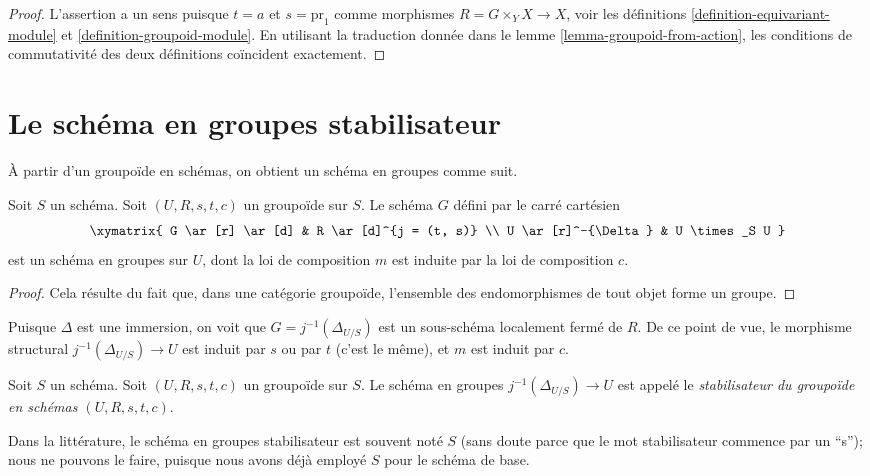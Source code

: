 \begin{proof}
L'assertion a un sens puisque $t = a$ et $s = \text{pr}_1$
comme morphismes $R = G \times_Y X \to X$, voir les
définitions \ref{definition-equivariant-module} et
\ref{definition-groupoid-module}.
En utilisant la traduction donnée dans le lemme \ref{lemma-groupoid-from-action},
les conditions de commutativité
des deux définitions coïncident exactement.
\end{proof}





\section{Le schéma en groupes stabilisateur}
\label{section-stabilizer}

\noindent
À partir d'un groupoïde en schémas, on obtient un schéma en groupes comme suit.

\begin{lemma}
\label{lemma-groupoid-stabilizer}
Soit $S$ un schéma.
Soit $(U, R, s, t, c)$ un groupoïde sur $S$.
Le schéma $G$ défini par le carré cartésien
$$
\xymatrix{
G \ar[r] \ar[d] & R \ar[d]^{j = (t, s)} \\
U \ar[r]^-{\Delta} & U \times_S U
}
$$
est un schéma en groupes sur $U$, dont la loi de composition
$m$ est induite par la loi de composition $c$.
\end{lemma}

\begin{proof}
Cela résulte du fait que, dans une catégorie groupoïde, l'ensemble
des endomorphismes de tout objet forme un groupe.
\end{proof}

\noindent
Puisque $\Delta$ est une immersion, on voit que $G = j^{-1}(\Delta_{U/S})$
est un sous-schéma localement fermé de $R$. De ce point de vue,
le morphisme structural $j^{-1}(\Delta_{U/S}) \to U$ est induit par
$s$ ou par $t$ (c'est le même), et $m$ est induit par $c$.

\begin{definition}
\label{definition-stabilizer-groupoid}
Soit $S$ un schéma.
Soit $(U, R, s, t, c)$ un groupoïde sur $S$.
Le schéma en groupes $j^{-1}(\Delta_{U/S})\to U$
est appelé le {\it stabilisateur du groupoïde en schémas
$(U, R, s, t, c)$}.
\end{definition}

\noindent
Dans la littérature, le schéma en groupes stabilisateur est souvent noté $S$
(sans doute parce que le mot stabilisateur commence par un ``s'');
nous ne pouvons le faire, puisque nous avons déjà employé $S$ pour le schéma de base.

